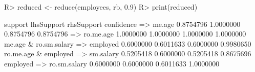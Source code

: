 \begin{Schunk}
% --begin: "reduce"
\begin{Sinput}
R> reduced <- reduce(employees, rb, 0.9)
R> print(reduced)
\end{Sinput}
\begin{Soutput}
                                    support lhsSupport rhsSupport confidence
 => me.age                        0.8754796  1.0000000  0.8754796  0.8754796
 => ro.me.age                     1.0000000  1.0000000  1.0000000  1.0000000
me.age & ro.sm.salary => employed 0.6000000  0.6011633  0.6000000  0.9980650
ro.me.age & employed => sm.salary 0.5205418  0.6000000  0.5205418  0.8675696
employed => ro.sm.salary          0.6000000  0.6000000  0.6011633  1.0000000
\end{Soutput}
%
% --end: "reduce"
\end{Schunk}
